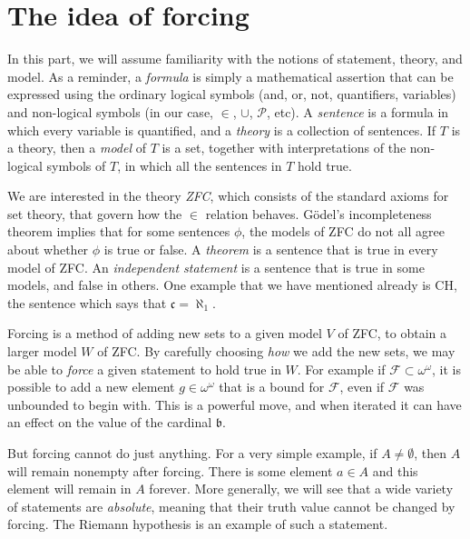 \documentclass[11pt,oneside]{amsbook}
\theoremstyle{definition}
\theoremstyle{plain}
\theoremstyle{definition}
\theoremstyle{remark}
\numberwithin{equation}{section}
\numberwithin{figure}{section}
\begin{document}
\section{The idea of forcing}
\label{sec:idea-forcing}

In this part, we will assume familiarity with the notions of statement, theory, and model. As a reminder, a \emph{formula} is simply a mathematical assertion that can be expressed using the ordinary logical symbols (and, or, not, quantifiers, variables) and non-logical symbols (in our case, $\in$, $\cup$, $\mathcal P$, etc). A \emph{sentence} is a formula in which every variable is quantified, and a \emph{theory} is a collection of sentences. If $T$ is a theory, then a \emph{model} of $T$ is a set, together with interpretations of the non-logical symbols of $T$, in which all the sentences in $T$ hold true.

We are interested in the theory \emph{ZFC}, which consists of the standard axioms for set theory, that govern how the $\in$ relation behaves. G\"odel's incompleteness theorem implies that for some sentences $\phi$, the models of ZFC do not all agree about whether $\phi$ is true or false. A \emph{theorem} is a sentence that is true in every model of ZFC. An \emph{independent statement} is a sentence that is true in some models, and false in others. One example that we have mentioned already is CH, the sentence which says that $\mathfrak c=\aleph_1$.


Forcing is a method of adding new sets to a given model $V$ of ZFC, to obtain a larger model $W$ of ZFC. By carefully choosing \emph{how} we add the new sets, we may be able to \emph{force} a given statement to hold true in $W$. For example if $\mathcal F\subset\omega^\omega$, it is possible to add a new element $g\in\omega^\omega$ that is a bound for $\mathcal F$, even if $\mathcal F$ was unbounded to begin with. This is a powerful move, and when iterated it can have an effect on the value of the cardinal $\mathfrak b$.

But forcing cannot do just anything. For a very simple example, if $A\neq\emptyset$, then $A$ will remain nonempty after forcing. There is some element $a\in A$ and this element will remain in $A$ forever. More generally, we will see that a wide variety of statements are \emph{absolute}, meaning that their truth value cannot be changed by forcing. The Riemann hypothesis is an example of such a statement.
\end{document}
